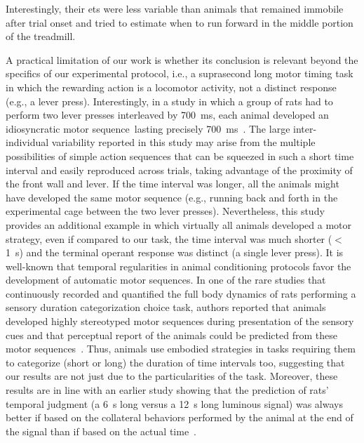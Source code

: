 Interestingly, their \glspl{et} were less variable than animals that remained immobile after trial onset and tried to estimate when to run forward in the middle portion of the treadmill.
\par
A practical limitation of our work is whether its conclusion is relevant beyond the specifics of our experimental protocol, i.e., a suprasecond long motor timing task in which the rewarding action is a locomotor activity, not a distinct response (e.g., a lever press).
Interestingly, in a study in which a group of rats had to perform two lever presses interleaved by 700~ms, each animal developed an idiosyncratic motor sequence\footnotemark\ lasting precisely 700~ms~\cite{Kawai2015}.
The large inter-individual variability reported in this study may arise from the multiple possibilities of simple action sequences that can be squeezed in such a short time interval and easily reproduced across trials, taking advantage of the proximity of the front wall and lever.
If the time interval was longer, all the animals might have developed the same motor sequence (e.g., running back and forth in the experimental cage between the two lever presses).
Nevertheless, this study provides an additional example in which virtually all animals developed a motor strategy, even if compared to our task, the time interval was much shorter ($<$1~s) and the terminal operant response was distinct (a single lever press).
It is well-known that temporal regularities in animal conditioning protocols favor the development of automatic motor sequences.
In one of the rare studies that continuously recorded and quantified the full body dynamics of rats performing a sensory duration categorization choice task, authors reported that animals developed highly stereotyped motor sequences during presentation of the sensory cues and that perceptual report of the animals could be predicted from these motor sequences~\cite{Gouvea2014}.
Thus, animals use embodied strategies in tasks requiring them to categorize (short or long) the duration of time intervals too, suggesting that our results are not just due to the particularities of the task.
Moreover, these results are in line with an earlier study showing that the prediction of rats' temporal judgment (a 6~s long versus a 12~s long luminous signal) was always better if based on the collateral behaviors performed by the animal at the end of the signal than if based on the actual time~\cite{Fetterman1998BehProc}.
